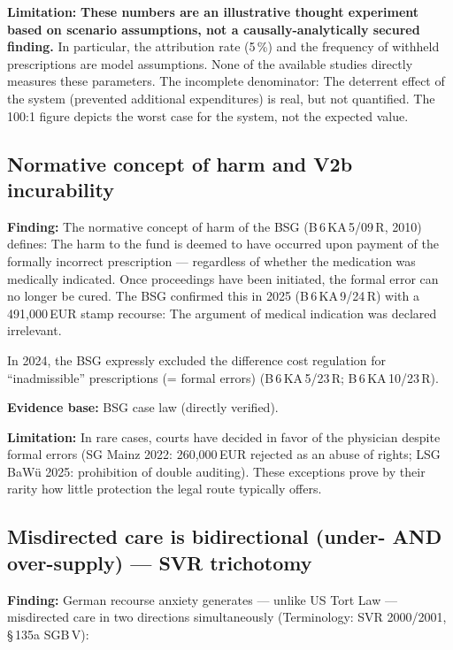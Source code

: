\documentclass{umbruch-position}
\begin{document}
\textbf{Limitation:} \textbf{These numbers are an illustrative thought experiment based on scenario assumptions, not a causally-analytically secured finding.} In particular, the attribution rate (5\,\%) and the frequency of withheld prescriptions are model assumptions. None of the available studies directly measures these parameters. The incomplete denominator: The deterrent effect of the system (prevented additional expenditures) is real, but not quantified. The 100:1 figure depicts the worst case for the system, not the expected value.

\subsection{Normative concept of harm and V2b incurability}

\textbf{Finding:} The normative concept of harm of the BSG (B\,6\,KA\,5/09\,R, 2010) defines: The harm to the fund is deemed to have occurred upon payment of the formally incorrect prescription --- regardless of whether the medication was medically indicated. Once proceedings have been initiated, the formal error can no longer be cured. The BSG confirmed this in 2025 (B\,6\,KA\,9/24\,R) with a 491,000\,EUR stamp recourse: The argument of medical indication was declared irrelevant.

In 2024, the BSG expressly excluded the difference cost regulation for ``inadmissible'' prescriptions (= formal errors) (B\,6\,KA\,5/23\,R; B\,6\,KA\,10/23\,R).

\textbf{Evidence base:} BSG case law (directly verified).

\textbf{Limitation:} In rare cases, courts have decided in favor of the physician despite formal errors (SG Mainz 2022: 260,000\,EUR rejected as an abuse of rights; LSG BaW\"u 2025: prohibition of double auditing). These exceptions prove by their rarity how little protection the legal route typically offers.

\subsection{Misdirected care is bidirectional (under- AND over-supply) --- SVR trichotomy}

\textbf{Finding:} German recourse anxiety generates --- unlike US Tort Law --- misdirected care in two directions simultaneously (Terminology: SVR 2000/2001, \S\,135a SGB\,V):
\end{document}
